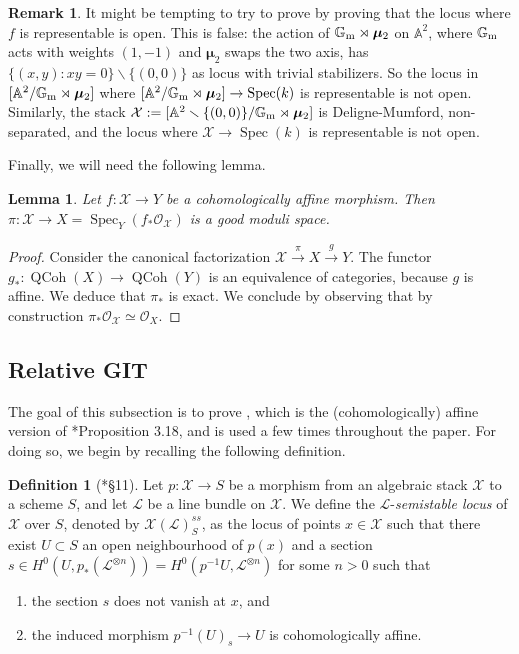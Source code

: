 \documentclass{amsart}
\newcommand{\bA}{\mathbb{A}}
\newcommand{\bG}{\mathbb{G}}
\newcommand{\cL}{\mathcal{L}}
\newcommand{\cO}{\mathcal{O}}
\newcommand{\cX}{\mathcal{X}}
\newcommand{\spec}{\operatorname{Spec}}
\newcommand{\Gm}{\bG_{{\rm m}}}
\newcommand{\bmu}{\bm{\mu}}
\newtheorem{Lemma}[theorem]{Lemma}
\theoremstyle{definition}
\newtheorem{Def}[theorem]{Definition}
\newtheorem{Remark}[theorem]{Remark}
\theoremstyle{definition}
\begin{document}
{\begin{Remark}
    It might be tempting to try to prove  by proving that the locus where $f$ is representable is open. This is false: the action of $\Gm\rtimes \bmu_2$ on $\bA^2$, where $\Gm$ acts with weights $(1,-1)$ and $\bmu_2$ swaps the two axis, has $\{(x,y):xy=0\}\smallsetminus\{(0,0)\}$ as  locus with trivial stabilizers. So the locus in $[\bA^2/\Gm\rtimes \bmu_2]$ where $[\bA^2/\Gm\rtimes \bmu_2]\to \spec(k)$ is representable is not open. Similarly, the stack $\cX:=[\bA^2\smallsetminus\{(0,0)\}/\Gm\rtimes \bmu_2]$ is Deligne-Mumford, non-separated, and the locus where $\cX\to\spec(k)$ is representable is not open. 
    \end{Remark}
    Finally, we will need the following lemma.
\begin{Lemma}\label{lm:stein of coh aff is gms}
    Let $f\colon \cX \to Y$ be a cohomologically affine morphism. Then $\pi\colon \cX\to X=\spec_Y(f_*\cO_{\cX})$ is a good moduli space.
\end{Lemma}
\begin{proof}
    Consider the canonical factorization $\cX\overset{\pi}{\to}X \overset{g}{\to} Y$. The functor $g_*\colon \operatorname{QCoh}(X) \to \operatorname{QCoh}(Y)$ is an equivalence of categories, because $g$ is affine. We deduce that $\pi_*$ is exact. We conclude by observing that by construction $\pi_*\cO_{\cX}\simeq \cO_X$.
\end{proof}
 \subsection{Relative GIT}\label{subsection_relative_GIT}
 The goal of this subsection is to prove , which is the (cohomologically) affine version of \cite{ER21}*{Proposition 3.18}, and is used a few times throughout the paper. For doing so, we begin by recalling the following definition.
 
 \begin{Def}[\cite{Alp}*{\S 11}]
     Let $p:\cX\to S$ be a morphism from an algebraic stack $\cX$ to a scheme $S$, and let $\cL$ be a line bundle on $\cX$. We define the $\cL$-\textit{semistable locus} of $\cX$ over $S$, denoted by $\cX(\cL)^{ss}_S$, as the locus of points $x\in \cX$ such that there exist $U\subset S$ an open neighbourhood of $p(x)$ and a section $s\in H^0(U, p_*(\cL^{\otimes n}))=H^0(p^{-1}U,\cL^{\otimes n})$ for some $n>0$ such that
     \begin{enumerate}
         \item the section $s$ does not vanish at $x$, and
         \item the induced morphism $p^{-1}(U)_s \to U$ is cohomologically affine.
     \end{enumerate} 
 \end{Def}

}
\end{document}
